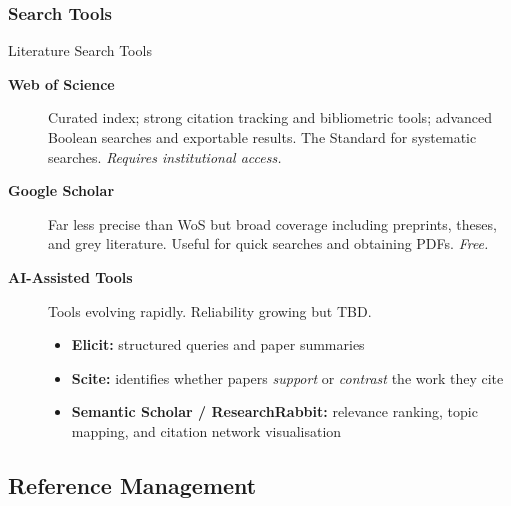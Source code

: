 \documentclass{beamer}
\begin{document}
\subsubsection{Search Tools}
\begin{frame}{Literature Search Tools}

  \footnotesize
  \begin{description}
    \item[\textbf{Web of Science}]
      Curated index; strong citation tracking and bibliometric
      tools; advanced Boolean searches and exportable
      results. The Standard for systematic searches.
      {\scriptsize \textit{Requires institutional access.}}

    \item[\textbf{Google Scholar}]
      Far less precise than WoS but broad coverage including preprints, theses, and
      grey literature. 
      Useful for quick searches and obtaining PDFs.
      {\scriptsize \textit{Free.}}

    \item[\textbf{AI-Assisted Tools}]
       {\scriptsize Tools evolving rapidly. Reliability growing but TBD.}\\
      \begin{itemize}\footnotesize
        \item \textbf{Elicit:} structured queries
          and paper summaries
        \item \textbf{Scite:} identifies whether papers \emph{support} or
          \emph{contrast} the work they cite
        \item \textbf{Semantic Scholar / ResearchRabbit:}
          relevance ranking, topic mapping, and citation
          network visualisation
      \end{itemize}
  \end{description}

\end{frame}


\subsection{Reference Management}
\end{document}
